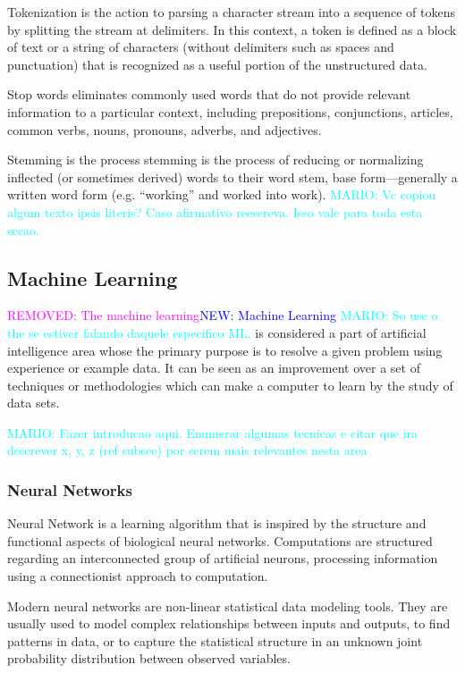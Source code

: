 \documentclass[10pt, conference]{IEEEtran}
\newcommand{\mario}[1]{\noindent\textcolor{cyan}{MARIO: {#1}}}
\newcommand{\rem}[1]{\noindent\textcolor{magenta}{REMOVED: {#1}}}
\newcommand{\new}[1]{\noindent\textcolor{blue}{NEW: {#1}}}
\newcommand{\mario}[1]{}
\newcommand{\rem}[1]{}
\newcommand{\new}[1]{#1}
\begin{document}
Tokenization is the action to parsing a character stream into a sequence of tokens by splitting the stream at delimiters. In this context, a token is defined as a block of text or a string of characters (without delimiters such as spaces and punctuation) that is recognized as a useful portion of the unstructured data.

Stop words eliminates commonly used words that do not provide relevant information to a particular context, including prepositions, conjunctions, articles, common verbs, nouns, pronouns, adverbs, and adjectives.

Stemming is the process stemming is the process of reducing or normalizing inflected (or sometimes derived) words to their word stem, base form—generally a written word form (e.g. “working” and worked into work). \mario{Vc copiou algum texto ipsis literis? Caso afirmativo reescreva. Isso vale para toda esta secao.}

\subsection{Machine Learning}   \label{subsec:ml}
\rem{The machine learning}\new{Machine Learning} \mario{So use o the se estiver falando daquele especifico ML.} is considered a part of artificial intelligence area whose the primary purpose is to resolve a given problem using experience or example data\cite{Surya2016}. It can be seen as an improvement over a set of techniques or methodologies which can make a computer to learn by the study of data sets.

\mario{Fazer introducao aqui. Enumerar algumas tecnicas e citar que ira descrever x, y, z (ref subsec) por serem mais relevantes nesta area}

\subsubsection{Neural Networks}   \label{subsubsec:nn}
Neural Network is a learning algorithm that is inspired by the structure and functional aspects of biological neural networks\cite{Russell2010}. Computations are structured regarding an interconnected group of artificial neurons, processing information using a connectionist approach to computation. 

Modern neural networks are non-linear statistical data modeling tools. They are usually used to model complex relationships between inputs and outputs, to find patterns in data, or to capture the statistical structure in an unknown joint probability distribution between observed variables.
\end{document}
